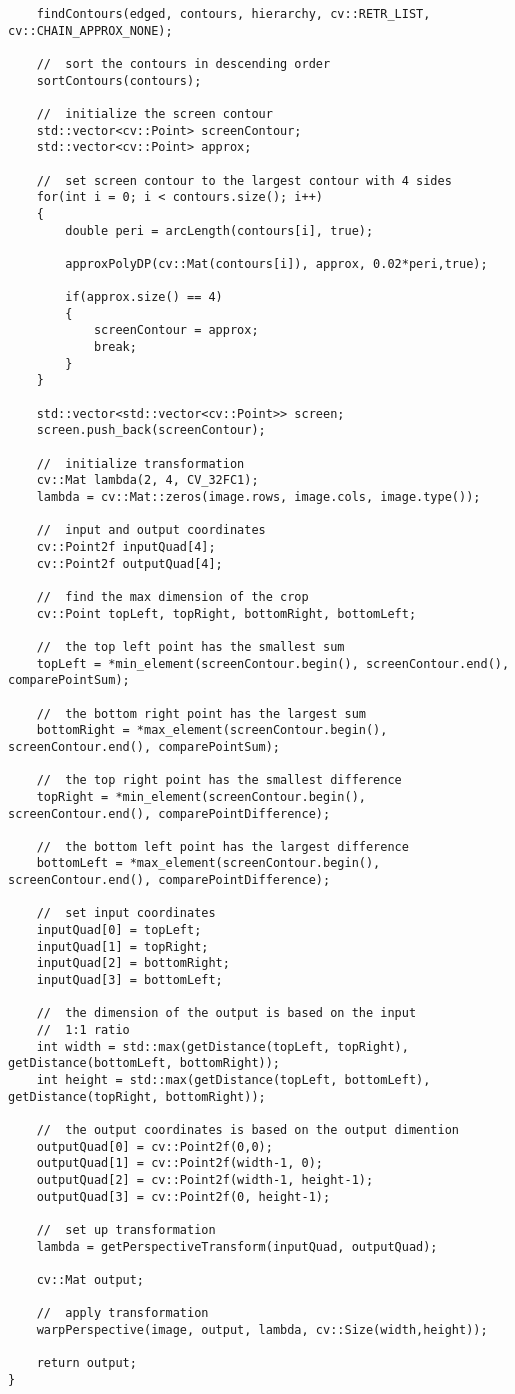 \begin{lstlisting}
	findContours(edged, contours, hierarchy, cv::RETR_LIST, cv::CHAIN_APPROX_NONE);
	
	//	sort the contours in descending order
	sortContours(contours);
	
	//	initialize the screen contour
	std::vector<cv::Point> screenContour;
	std::vector<cv::Point> approx;
	
	//	set screen contour to the largest contour with 4 sides
	for(int i = 0; i < contours.size(); i++)
	{
		double peri = arcLength(contours[i], true);
		
		approxPolyDP(cv::Mat(contours[i]), approx, 0.02*peri,true);
		
		if(approx.size() == 4)
		{
			screenContour = approx;
			break;
		}
	}
	
	std::vector<std::vector<cv::Point>> screen;
	screen.push_back(screenContour);
	
	//	initialize transformation
	cv::Mat lambda(2, 4, CV_32FC1);
	lambda = cv::Mat::zeros(image.rows, image.cols, image.type());
	
	//	input and output coordinates
	cv::Point2f inputQuad[4];
	cv::Point2f outputQuad[4];
	
	//	find the max dimension of the crop
	cv::Point topLeft, topRight, bottomRight, bottomLeft;
	
	//	the top left point has the smallest sum
	topLeft = *min_element(screenContour.begin(), screenContour.end(), comparePointSum);
	
	//	the bottom right point has the largest sum
	bottomRight = *max_element(screenContour.begin(), screenContour.end(), comparePointSum);
	
	//	the top right point has the smallest difference
	topRight = *min_element(screenContour.begin(), screenContour.end(), comparePointDifference);
	
	//	the bottom left point has the largest difference
	bottomLeft = *max_element(screenContour.begin(), screenContour.end(), comparePointDifference);

	//	set input coordinates
	inputQuad[0] = topLeft;
	inputQuad[1] = topRight;
	inputQuad[2] = bottomRight;
	inputQuad[3] = bottomLeft;
	
	//	the dimension of the output is based on the input
	//	1:1 ratio
	int width = std::max(getDistance(topLeft, topRight), getDistance(bottomLeft, bottomRight));
	int height = std::max(getDistance(topLeft, bottomLeft), getDistance(topRight, bottomRight));
	
	//	the output coordinates is based on the output dimention
	outputQuad[0] = cv::Point2f(0,0);
	outputQuad[1] = cv::Point2f(width-1, 0);
	outputQuad[2] = cv::Point2f(width-1, height-1);
	outputQuad[3] = cv::Point2f(0, height-1);
	
	//	set up transformation
	lambda = getPerspectiveTransform(inputQuad, outputQuad);
	
	cv::Mat output;
	
	//	apply transformation
	warpPerspective(image, output, lambda, cv::Size(width,height));
	
	return output;
}

\end{lstlisting}

